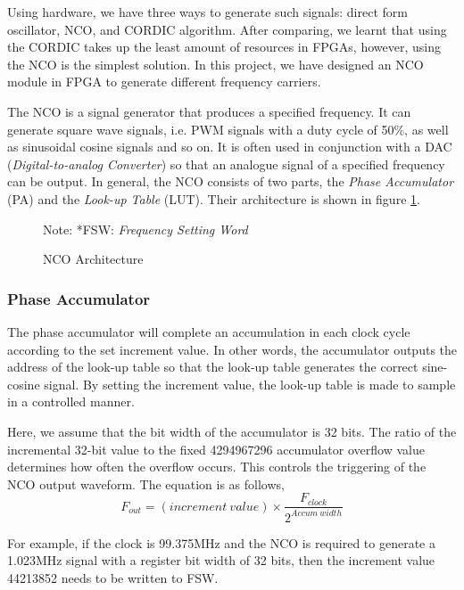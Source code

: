 Using hardware, we have three ways to generate such signals: direct form oscillator, NCO, and CORDIC algorithm. After comparing, we learnt that using the CORDIC takes up the least amount of resources in FPGAs\cite{RN181}, however, using the NCO is the simplest solution. In this project, we have designed an NCO module in FPGA to generate different frequency carriers.

The NCO is a signal generator that produces a specified frequency. It can generate square wave signals, i.e. PWM signals with a duty cycle of 50\%, as well as sinusoidal cosine signals and so on\cite{RN189}. It is often used in conjunction with a DAC (\textit{Digital-to-analog Converter}) so that an analogue signal of a specified frequency can be output. In general, the NCO consists of two parts, the \textit{Phase Accumulator} (PA) and the \textit{Look-up Table} (LUT)\cite{RN191-1}. Their architecture is shown in figure \ref{fig:nco}.

\begin{figure}[!h]
    \centering
    
    \caption{NCO Architecture}
    \label{fig:nco}
    \footnotesize Note: *FSW: \textit{Frequency Setting Word}
\end{figure}

\subsubsection{Phase Accumulator}
The phase accumulator will complete an accumulation in each clock cycle according to the set increment value. In other words, the accumulator outputs the address of the look-up table so that the look-up table generates the correct sine-cosine signal\cite{RN191}. By setting the increment value, the look-up table is made to sample in a controlled manner.

Here, we assume that the bit width of the accumulator is 32 bits. The ratio of the incremental 32-bit value to the fixed \num{4294967296} accumulator overflow value determines how often the overflow occurs. This controls the triggering of the NCO output waveform. The equation is as follows,
\begin{equation}
    F_{out} = (increment\ value) \times \frac{F_{clock}}{2^{Accum\ width}}
\end{equation}

For example, if the clock is 99.375MHz and the NCO is required to generate a 1.023MHz signal with a register bit width of 32 bits, then the increment value \num{44213852} needs to be written to FSW.

